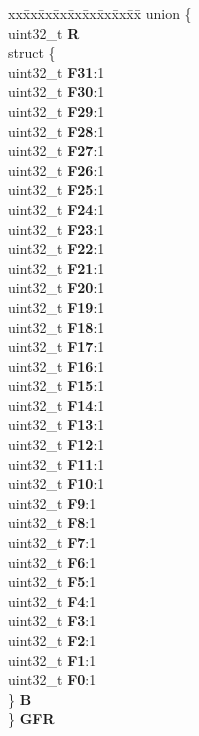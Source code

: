 \begin{DoxyCompactItemize}
\begin{tabbing}
\end{tabbing}\item 
\mbox{\label{structEMIOS__tag_ab11b95a7f07fd0c80f7aad1e8d63df39}} 
\begin{tabbing}
xx\=xx\=xx\=xx\=xx\=xx\=xx\=xx\=xx\=\kill
union \{\\
\>uint32\_t {\bfseries R}\\
\>struct \{\\
\>\>uint32\_t {\bfseries F31}:1\\
\>\>uint32\_t {\bfseries F30}:1\\
\>\>uint32\_t {\bfseries F29}:1\\
\>\>uint32\_t {\bfseries F28}:1\\
\>\>uint32\_t {\bfseries F27}:1\\
\>\>uint32\_t {\bfseries F26}:1\\
\>\>uint32\_t {\bfseries F25}:1\\
\>\>uint32\_t {\bfseries F24}:1\\
\>\>uint32\_t {\bfseries F23}:1\\
\>\>uint32\_t {\bfseries F22}:1\\
\>\>uint32\_t {\bfseries F21}:1\\
\>\>uint32\_t {\bfseries F20}:1\\
\>\>uint32\_t {\bfseries F19}:1\\
\>\>uint32\_t {\bfseries F18}:1\\
\>\>uint32\_t {\bfseries F17}:1\\
\>\>uint32\_t {\bfseries F16}:1\\
\>\>uint32\_t {\bfseries F15}:1\\
\>\>uint32\_t {\bfseries F14}:1\\
\>\>uint32\_t {\bfseries F13}:1\\
\>\>uint32\_t {\bfseries F12}:1\\
\>\>uint32\_t {\bfseries F11}:1\\
\>\>uint32\_t {\bfseries F10}:1\\
\>\>uint32\_t {\bfseries F9}:1\\
\>\>uint32\_t {\bfseries F8}:1\\
\>\>uint32\_t {\bfseries F7}:1\\
\>\>uint32\_t {\bfseries F6}:1\\
\>\>uint32\_t {\bfseries F5}:1\\
\>\>uint32\_t {\bfseries F4}:1\\
\>\>uint32\_t {\bfseries F3}:1\\
\>\>uint32\_t {\bfseries F2}:1\\
\>\>uint32\_t {\bfseries F1}:1\\
\>\>uint32\_t {\bfseries F0}:1\\
\>\} {\bfseries B}\\
\} {\bfseries GFR}\\


\end{tabbing}
\end{DoxyCompactItemize}
